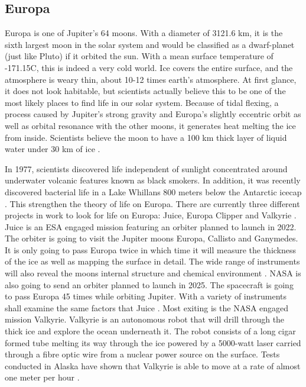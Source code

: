 \subsection*{Europa}
 
Europa is one of Jupiter's 64 moons.
With a diameter of 3121.6 km, it is the sixth largest moon in the solar system and would be classified as a dwarf-planet (just like Pluto) if it orbited the sun.
With a mean surface temperature of -171.15\degree C, this is indeed a very cold world.
Ice covers the entire surface, and the atmosphere is weary thin, about 10-12 times earth's atmosphere.
At first glance, it does not look habitable, but scientists actually believe this to be one of the most likely places to find life in our solar system.
Because of tidal flexing, a process caused by Jupiter’s strong gravity and Europa’s slightly eccentric orbit as well as orbital resonance with the other moons, it generates heat melting the ice from inside.
Scientists believe the moon to have a 100 km thick layer of liquid water under 30 km of ice \cite{FPlan03} \cite{FPlan24}.
 
In 1977, scientists discovered life independent of sunlight concentrated around underwater volcanic features known as black smokers.
In addition, it was recently discovered bacterial life in a Lake Whillans 800 meters below the Antarctic icecap \cite{FPlan04}. This strengthen the theory of life on Europa.
There are currently three different projects in work to look for life on Europa: Juice, Europa Clipper and Valkyrie \cite{FPlan24}.
Juice is an ESA engaged mission featuring an orbiter planned to launch in 2022.
The orbiter is going to visit the Jupiter moons Europa, Callisto and Ganymedes.
It is only going to pass Europa twice in which time it will measure the thickness of the ice as well as mapping the surface in detail.
The wide range of instruments will also reveal the moons internal structure and chemical environment \cite{FPlan24}.
NASA is also going to send an orbiter planned to launch in 2025.
The spacecraft is going to pass Europa 45 times while orbiting Jupiter.
With a variety of instruments shall examine the same factors that Juice \cite{FPlan24}.
Most exiting is the NASA engaged mission Valkyrie.
Valkyrie is an autonomous robot that will drill through the thick ice and explore the ocean underneath it.
The robot consists of a long cigar formed tube melting its way through the ice powered by a 5000-watt laser carried through a fibre optic wire from a nuclear power source on the surface.
Tests conducted in Alaska have shown that Valkyrie is able to move at a rate of almost one meter per hour \cite{FPlan24} \cite{FPlan25}.

